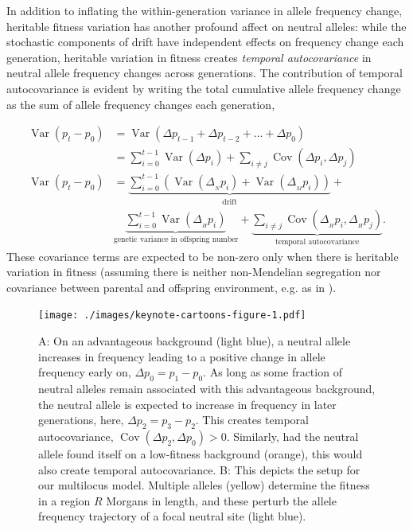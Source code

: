 \documentclass[11pt]{article}
\newcommand{\nnn}{\nonumber}
\DeclareMathOperator{\var}{Var}
\DeclareMathOperator{\cov}{Cov}
\begin{document}
In addition to inflating the within-generation variance in allele frequency
change, heritable fitness variation has another profound affect on neutral
alleles: while the stochastic components of drift have independent effects on
frequency change each generation, heritable variation in fitness creates
\emph{temporal autocovariance} in neutral allele frequency changes across
generations. The contribution of temporal autocovariance is evident by writing
the total cumulative allele frequency change as the sum of allele frequency
changes each generation,

\begin{align}
  \label{eq:var-decomp}
  \var(p_t - p_0) &= \var(\Delta p_{t-1} + \Delta p_{t-2} + \ldots + \Delta p_0) \nnn \\
                  &= \sum_{i=0}^{t-1} \var(\Delta p_i) + \sum_{i \ne j} \cov(\Delta p_{i}, \Delta p_{j}) \nnn \\
  \var(p_t - p_0) &= \underbrace{\sum_{i=0}^{t-1} \left(\var(\Delta_{_N} p_i) +  \var(\Delta_{_M} p_i) \right)}_\text{drift} +  \nonumber\\ 
                  &\underbrace{\sum_{i=0}^{t-1} \var(\Delta_{_H} p_i)}_\text{genetic variance in offspring number} + \underbrace{\sum_{i \ne j} \cov(\Delta_{_H} p_i, \Delta_{_H} p_j)}_\text{temporal autocovariance}.
\end{align}
%
These covariance terms are expected to be non-zero only when there is heritable
variation in fitness (assuming there is neither non-Mendelian segregation nor
covariance between parental and offspring environment, e.g. as in
\cite{Heyer2005-cl}).

\begin{figure}[!ht]
  \centering
  \texttt{[image: ./images/keynote-cartoons-figure-1.pdf]}

  \caption{A: On an advantageous background (light blue), a neutral allele
    increases in frequency leading to a positive change in allele frequency
    early on, $\Delta p_0 = p_1 - p_0$. As long as some fraction of neutral
    alleles remain associated with this advantageous background, the neutral
    allele is expected to increase in frequency in later generations, here,
    $\Delta p_2 = p_3 - p_2$. This creates temporal autocovariance,
    $\cov(\Delta p_2, \Delta p_0) > 0$. Similarly, had the neutral allele found
    itself on a low-fitness background (orange), this would also create temporal
    autocovariance.  B: This depicts the setup for our multilocus model.
    Multiple alleles (yellow) determine the fitness in a region $R$ 
    Morgans in length, and these perturb the allele frequency trajectory 
    of a focal neutral site (light blue). 
  }
  \label{fig:cartoon}
\end{figure}
\end{document}
